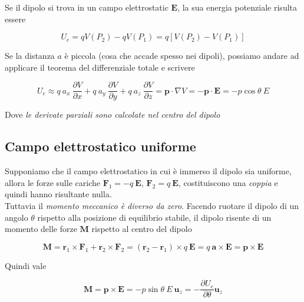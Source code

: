 Se il dipolo si trova in un campo elettrostatic $\mathbf{E}$, la sua energia potenziale risulta essere

\begin{equation*}
U_e = q V(P_2) - q V(P_1) = q  [V(P_2) - V(P_1)]
\end{equation*}

Se la distanza $a$ è piccola (cosa che accade spesso nei dipoli), possiamo andare ad applicare il teorema del differenziale totale e scrivere

\begin{tcolorbox}[colback=yellow!10!white, colframe=orange!70!black, boxrule=0.8pt]
\begin{equation}
    U_e \approx q \ a_x \ \frac{\partial V}{\partial x} + q \ a_y \ \frac{\partial V}{\partial y}  + q \ a_z \ \frac{\partial V}{\partial z}  = \mathbf{p} \cdot \nabla V = - \mathbf{p \cdot \mathbf{E}} = - p \cos \theta \ E
    \label{eq:energia_potenziale_dipolo}
\end{equation}
\end{tcolorbox}

Dove \emph{le derivate parziali sono calcolate nel centro del dipolo}

\subsection{Campo elettrostatico uniforme}

Supponiamo che il campo elettrostatico in cui è immerso il dipolo sia uniforme, allora le forze sulle cariche $\mathbf{F}_1 = - q \ \mathbf{E}$, $\mathbf{F}_2 = q \ \mathbf{E}$, costituiscono una \emph{coppia} e quindi hanno risultante nulla.\\

Tuttavia il \emph{momento meccanico è diverso da zero}. Facendo ruotare il dipolo di un angolo $\theta$ rispetto alla posizione di equilibrio stabile, il dipolo risente di un momento delle forze $\mathbf{M}$ rispetto al centro del dipolo

\begin{equation}
    \mathbf{M} = \mathbf{r}_1 \times \mathbf{F}_1 + \mathbf{r}_2 \times \mathbf{F}_2 = (\mathbf{r}_2 - \mathbf{r}_1) \times q \ \mathbf{E} = q \ \mathbf{a} \times \mathbf{E} = \mathbf{p} \times \mathbf{E}
\end{equation}

Quindi vale 

\begin{tcolorbox}[colback=yellow!10!white, colframe=orange!70!black, boxrule=0.8pt]
\begin{equation}
    \mathbf{M} =\mathbf{p} \times \mathbf{E} =  - p \sin \theta \  E \  \mathbf{u}_z = - \frac{\partial U_e}{\partial \theta} \mathbf{u}_z
\end{equation}
\end{tcolorbox}

